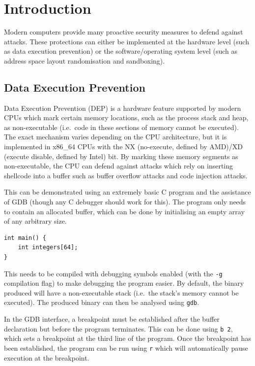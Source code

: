\hypertarget{introduction}{%
\section{Introduction}\label{introduction}}

Modern computers provide many proactive security measures to defend
against attacks. These protections can either be implemented at the
hardware level (such as data execution prevention) or the
software/operating system level (such as address space layout
randomisation and sandboxing).

\hypertarget{data-execution-prevention}{%
\subsection{Data Execution Prevention}\label{data-execution-prevention}}

Data Execution Prevention (DEP) is a hardware feature supported by
modern CPUs which mark certain memory locations, such as the process
stack and heap, as non-executable (i.e.~code in these sections of memory
cannot be executed). The exact mechanism varies depending on the CPU
architecture, but it is implemented in x86\_64 CPUs with the NX
(no-execute, defined by AMD)/XD (execute disable, defined by Intel) bit.
By marking these memory segments as non-executable, the CPU can defend
against attacks which rely on inserting shellcode into a buffer such as
buffer overflow attacks and code injection attacks.

This can be demonstrated using an extremely basic C program and the
assistance of GDB (though any C debugger should work for this). The
program only needs to contain an allocated buffer, which can be done by
initialising an empty array of any arbitrary size.

\begin{verbatim}
int main() {
    int integers[64];
}
\end{verbatim}

This needs to be compiled with debugging symbols enabled (with the
\texttt{-g} compilation flag) to make debugging the program easier. By
default, the binary produced will have a non-executable stack (i.e.~the
stack's memory cannot be executed). The produced binary can then be
analysed using \texttt{gdb}.

In the GDB interface, a breakpoint must be established after the buffer
declaration but before the program terminates. This can be done using
\texttt{b\ 2}, which sets a breakpoint at the third line of the program.
Once the breakpoint has been established, the program can be run using
\texttt{r} which will automatically pause execution at the breakpoint.

